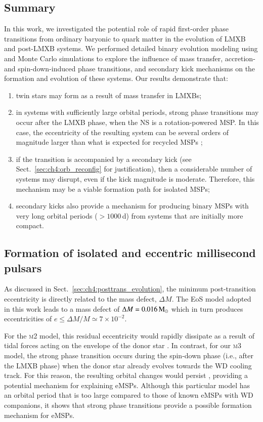 \documentclass[main.tex]{subfiles}
\begin{document}
    \subsection{Summary}
    In this work, we investigated the potential role of rapid first-order phase transitions from ordinary baryonic to quark matter in the evolution of LMXB and post-LMXB systems. 
    We performed detailed binary evolution modeling using \mesa and Monte Carlo simulations to explore the influence of mass transfer, accretion- and spin-down-induced phase transitions, and secondary kick mechanisms on the formation and evolution of these systems. Our results demonstrate that:
    \begin{enumerate}
        \item twin stars may form as a result of mass transfer in LMXBs; 
        \item in systems with sufficiently large orbital periods, strong phase transitions may occur after the LMXB phase, when the NS is a rotation-powered MSP. In this case, the eccentricity of the resulting system can be several orders of magnitude larger than what is expected for recycled MSPs \citep{Phinney:1992}; 
        \item if the transition is accompanied by a secondary kick (see Sect.~\ref{sec:ch4:orb_reconfig} for justification), then a considerable number of systems may  disrupt, even if the kick magnitude is moderate. Therefore, this mechanism may be a viable formation path for isolated MSPs;
        \item secondary kicks also provide a mechanism for producing binary MSPs with very long orbital periods ($>1000$\,d) from systems that are initially more compact. 
    \end{enumerate}
    
    
    
    \subsection{Formation of isolated and eccentric millisecond pulsars}\label{sec:ch4:msps}
    
    As discussed in Sect.~\ref{sec:ch4:posttrans_evolution},  the minimum post-transition eccentricity is directly related to the mass defect, $\Delta M$. The EoS model adopted in this work leads to a mass defect of $\Delta M = 0.016\mathrm{\,M_\odot}$ which in turn produces eccentricities  of $e\leq\Delta M / M \simeq 7 \times 10^{-2}$. 
    
    For the \textsc{m2} model, this residual eccentricity would rapidly dissipate as a result of tidal forces acting on the envelope of the donor star \citep{1977A&A....57..383Z}.  
    In contrast, for our \textsc{m3} model, the strong phase transition occurs during the spin-down phase (i.e., after the LMXB phase) when the donor star already evolves towards the WD cooling track. For this reason, the resulting orbital changes would persist \citep{Freire:mnras14,antoniadis:apjl14}, providing a potential mechanism for explaining eMSPs.  Although this particular model has an orbital period that is too large compared to those of known eMSPs with WD companions, it shows that strong phase transitions provide a possible formation mechanism for eMSPs.
    
\end{document}

